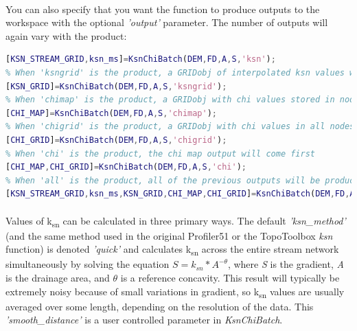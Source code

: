 \paragraph{}You can also specify that you want the function to produce outputs to the workspace with the optional \textit{'output'} parameter. The number of outputs will again vary with the product:

\begin{lstlisting}[language=Matlab]
% When 'ksn' is the 'product', two outputs will be produced, a GRIDobj with averaged ksn values stored in nodes along the stream network  (KSN_STREAM_GRID) and a geographic information structure of ksn values (ksn_ms)
[KSN_STREAM_GRID,ksn_ms]=KsnChiBatch(DEM,FD,A,S,'ksn');
% When 'ksngrid' is the product, a GRIDobj of interpolated ksn values will be produced
[KSN_GRID]=KsnChiBatch(DEM,FD,A,S,'ksngrid');
% When 'chimap' is the product, a GRIDobj with chi values stored in nodes along the stream network will be produced
[CHI_MAP]=KsnChiBatch(DEM,FD,A,S,'chimap');
% When 'chigrid' is the product, a GRIDobj with chi values in all nodes not excluded by outlet conditions will be produced
[CHI_GRID]=KsnChiBatch(DEM,FD,A,S,'chigrid');
% When 'chi' is the product, the chi map output will come first
[CHI_MAP,CHI_GRID]=KsnChiBatch(DEM,FD,A,S,'chi');
% When 'all' is the product, all of the previous outputs will be produced in the following order
[KSN_STREAM_GRID,ksn_ms,KSN_GRID,CHI_MAP,CHI_GRID]=KsnChiBatch(DEM,FD,A,S,'all');
\end{lstlisting}

\paragraph{}Values of k\textsubscript{sn} can be calculated in three primary ways. The default \textit{'ksn\_method'} (and the same method used in the original Profiler51 or the TopoToolbox \textit{ksn} function) is denoted \textit{'quick'} and calculates k\textsubscript{sn} across the entire stream network simultaneously by solving the equation \begin{math} S=k_{sn}*A^{-\theta}\end{math}, where \textit{S} is the gradient, \textit{A} is the drainage area, and \textit{$\theta$} is a reference concavity. This result will typically be extremely noisy because of small variations in gradient, so k\textsubscript{sn} values are usually averaged over some length, depending on the resolution of the data. This \textit{'smooth\_distance'} is a user controlled parameter in \textit{KsnChiBatch}. 

